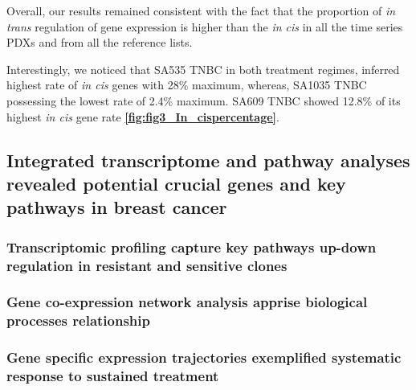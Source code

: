  Overall, our results remained consistent with the fact that the proportion of \textit{in trans} regulation of gene expression is higher than the \textit{in cis} in all the time series PDXs and from all the reference lists.   
 
 Interestingly, we noticed that SA535 TNBC in both treatment regimes, inferred highest rate of \textit{in cis} genes with 28\% maximum, whereas, SA1035 TNBC possessing the lowest rate of 2.4\% maximum. SA609 TNBC showed 12.8\% of its highest \textit{in cis} gene rate \textbf{\autoref{fig:fig3_In_cispercentage}}.





\subsection{Integrated transcriptome and pathway analyses revealed potential crucial genes and key pathways in breast cancer}

\subsubsection{Transcriptomic profiling capture key pathways up-down regulation in resistant and sensitive clones}

\subsubsection{Gene co-expression network analysis apprise biological processes relationship}
  

\subsubsection{Gene specific expression trajectories exemplified systematic response to sustained treatment}



